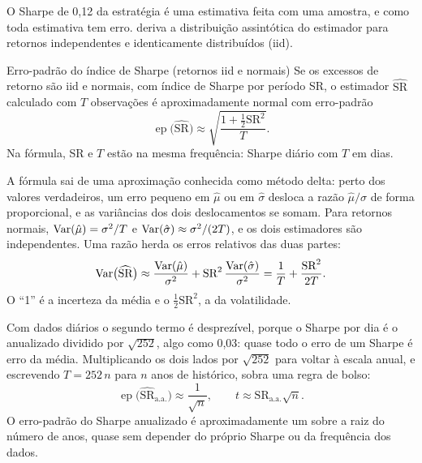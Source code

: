 O Sharpe de 0,12 da estratégia é uma estimativa feita com uma amostra, e como toda estimativa tem erro. \citet{lo2002} deriva a distribuição assintótica do estimador para retornos independentes e identicamente distribuídos (iid).

\begin{resultado}{Erro-padrão do índice de Sharpe (retornos iid e normais)}
Se os excessos de retorno são iid e normais, com índice de Sharpe por período SR, o estimador $\widehat{\text{SR}}$ calculado com $T$ observações é aproximadamente normal com erro-padrão
\begin{equation}
  \operatorname{ep}\bigl(\widehat{\text{SR}}\bigr) \approx \sqrt{\frac{1 + \tfrac{1}{2}\text{SR}^2}{T}} .
  \label{eq:c10-lo}
\end{equation}
Na fórmula, SR e $T$ estão na mesma frequência: Sharpe diário com $T$ em dias.
\end{resultado}

A fórmula sai de uma aproximação conhecida como método delta: perto dos valores verdadeiros, um erro pequeno em $\hat\mu$ ou em $\hat\sigma$ desloca a razão $\hat\mu/\hat\sigma$ de forma proporcional, e as variâncias dos dois deslocamentos se somam. Para retornos normais, $\operatorname{Var}(\hat\mu) = \sigma^2/T$ e $\operatorname{Var}(\hat\sigma) \approx \sigma^2/(2T)$, e os dois estimadores são independentes. Uma razão herda os erros relativos das duas partes:
\begin{equation*}
  \operatorname{Var}\bigl(\widehat{\text{SR}}\bigr) \approx \frac{\operatorname{Var}(\hat\mu)}{\sigma^2} + \text{SR}^2\,\frac{\operatorname{Var}(\hat\sigma)}{\sigma^2} = \frac{1}{T} + \frac{\text{SR}^2}{2T} .
\end{equation*}
O ``1'' é a incerteza da média e o $\tfrac12\text{SR}^2$, a da volatilidade.

Com dados diários o segundo termo é desprezível, porque o Sharpe por dia é o anualizado dividido por $\sqrt{252}$, algo como 0,03: quase todo o erro de um Sharpe é erro da média. Multiplicando os dois lados por $\sqrt{252}$ para voltar à escala anual, e escrevendo $T = 252\,n$ para $n$ anos de histórico, sobra uma regra de bolso:
\begin{equation}
  \operatorname{ep}\bigl(\widehat{\text{SR}}_{\text{a.a.}}\bigr) \approx \frac{1}{\sqrt{n}} , \qquad
  t \approx \text{SR}_{\text{a.a.}} \sqrt{n} .
  \label{eq:c10-regra-bolso}
\end{equation}
O erro-padrão do Sharpe anualizado é aproximadamente um sobre a raiz do número de anos, quase sem depender do próprio Sharpe ou da frequência dos dados.

